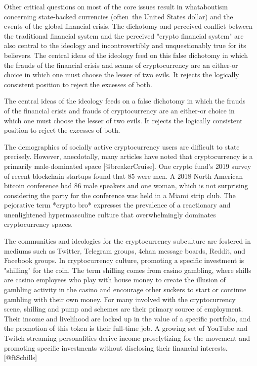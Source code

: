 
Other critical questions on most of the core issues result in whataboutism
concerning state-backed currencies (often the United States dollar) and the
events of the global financial crisis. The dichotomy and perceived conflict
between the traditional financial system and the perceived "crypto financial
system" are also central to the ideology and incontrovertibly and unquestionably
true for its believers. The central ideas of the ideology feed on this false
dichotomy in which the frauds of the financial crisis and scams of
cryptocurrency are an either-or choice in which one must choose the lesser of
two evils. It rejects the logically consistent position to reject the excesses
of both. \cite{@golumbia2016politics; @ftLibertarian}

The central ideas of the ideology feeds on a false dichotomy in which the frauds
of the financial crisis and frauds of cryptocurrency are an either-or choice in
which one must choose the lesser of two evils. It rejects the logically
consistent position to reject the excesses of both.
\cite{golumbia2016politics, ftLibertarian}


The demographics of socially active cryptocurrency users are difficult to state
precisely. However, anecdotally, many articles have noted that cryptocurrency is
a primarily male-dominated space [@breakerCruise]. One crypto fund's 2019 survey
of recent blockchain startups found that 85%
were men. A 2018 North American bitcoin conference had 86 male speakers and one
woman, which is not surprising considering the party for the conference was held
in a Miami strip club. The pejorative term *crypto bro* expresses the prevalence
of a reactionary and unenlightened hypermasculine culture that overwhelmingly
dominates cryptocurrency spaces.


The communities and ideologies for the cryptocurrency subculture are fostered in
mediums such as Twitter, Telegram groups, 4chan message boards, Reddit, and
Facebook groups. In cryptocurrency culture, promoting a specific investment is
"shilling" for the coin. The term shilling comes from casino gambling, where
shills are casino employees who play with house money to create the illusion of
gambling activity in the casino and encourage other suckers to start or continue
gambling with their own money. For many involved with the cryptocurrency scene,
shilling and pump and schemes are their primary source of employment. Their
income and livelihood are locked up in the value of a specific portfolio, and
the promotion of this token is their full-time job. A growing set of YouTube and
Twitch streaming personalities derive income proselytizing for the movement and
promoting specific investments without disclosing their financial interests.
[@ftSchills]

